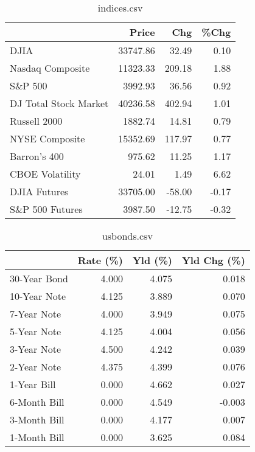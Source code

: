 \documentclass{article}%
\begin{document}
%


\begin{table}[htbp]%
\caption{indices.csv}%
\centering%
\begin{adjustbox}{width=1\textwidth}%
\begin{tabular}{lrrr}
\toprule
                      &    Price &    Chg &  \%Chg \\
\midrule
                 DJIA & 33747.86 &  32.49 &  0.10 \\
     Nasdaq Composite & 11323.33 & 209.18 &  1.88 \\
              S\&P 500 &  3992.93 &  36.56 &  0.92 \\
DJ Total Stock Market & 40236.58 & 402.94 &  1.01 \\
         Russell 2000 &  1882.74 &  14.81 &  0.79 \\
       NYSE Composite & 15352.69 & 117.97 &  0.77 \\
         Barron's 400 &   975.62 &  11.25 &  1.17 \\
      CBOE Volatility &    24.01 &   1.49 &  6.62 \\
         DJIA Futures & 33705.00 & -58.00 & -0.17 \\
      S\&P 500 Futures &  3987.50 & -12.75 & -0.32 \\
\bottomrule
\end{tabular}
%
\end{adjustbox}%
\end{table}

%


\begin{table}[htbp]%
\caption{usbonds.csv}%
\centering%
\begin{adjustbox}{width=1\textwidth}%
\begin{tabular}{lrrr}
\toprule
             &  Rate (\%) &  Yld (\%) &  Yld Chg (\%) \\
\midrule
30-Year Bond &     4.000 &    4.075 &        0.018 \\
10-Year Note &     4.125 &    3.889 &        0.070 \\
 7-Year Note &     4.000 &    3.949 &        0.075 \\
 5-Year Note &     4.125 &    4.004 &        0.056 \\
 3-Year Note &     4.500 &    4.242 &        0.039 \\
 2-Year Note &     4.375 &    4.399 &        0.076 \\
 1-Year Bill &     0.000 &    4.662 &        0.027 \\
6-Month Bill &     0.000 &    4.549 &       -0.003 \\
3-Month Bill &     0.000 &    4.177 &        0.007 \\
1-Month Bill &     0.000 &    3.625 &        0.084 \\
\bottomrule
\end{tabular}
%
\end{adjustbox}%
\end{table}
\end{document}
